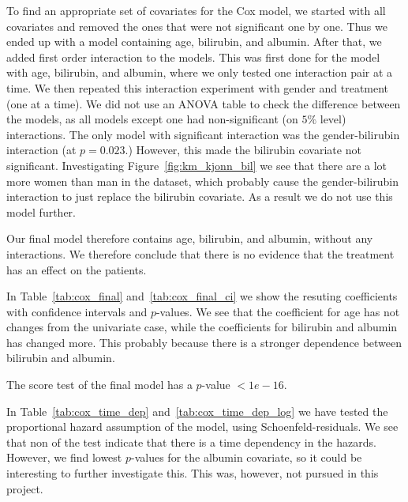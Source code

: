 \documentclass[11pt,a4paper]{article}
\begin{document}
To find an appropriate set of covariates for the Cox model, we started with all covariates and removed the ones that were not significant one by one. Thus we ended up with a model containing age, bilirubin, and albumin.
After that, we added first order interaction to the models. This was first done for the model with age, bilirubin, and albumin, where we only tested one interaction pair at a time. We then repeated this interaction experiment with gender and treatment (one at a time). We did not use an ANOVA table to check the difference between the models, as all models except one had non-significant (on $5\%$ level) interactions.
The only model with significant interaction was the gender-bilirubin interaction (at $p=0.023$.) However, this made the bilirubin covariate not significant. Investigating Figure~\ref{fig:km_kjonn_bil} we see that there are a lot more women than man in the dataset, which probably cause the gender-bilirubin interaction to just replace the bilirubin covariate. As a result we do not use this model further.

Our final model therefore contains age, bilirubin, and albumin, without any interactions. We therefore conclude that there is no evidence that the treatment has an effect on the patients.

In Table~\ref{tab:cox_final} and~\ref{tab:cox_final_ci} we show the resuting coefficients with confidence intervals and $p$-values. We see that the coefficient for age has not changes from the univariate case, while the coefficients for bilirubin and albumin has changed more. This probably because there is a stronger dependence between bilirubin and albumin.






The score test of the final model has a $p$-value $< 1e-16$.

In Table~\ref{tab:cox_time_dep} and~\ref{tab:cox_time_dep_log} we have tested the proportional hazard assumption of the model, using Schoenfeld-residuals. We see that non of the test indicate that there is a time dependency in the hazards. However, we find lowest $p$-values for the albumin covariate, so it could be interesting to further investigate this. This was, however, not pursued in this project.


\end{document}
